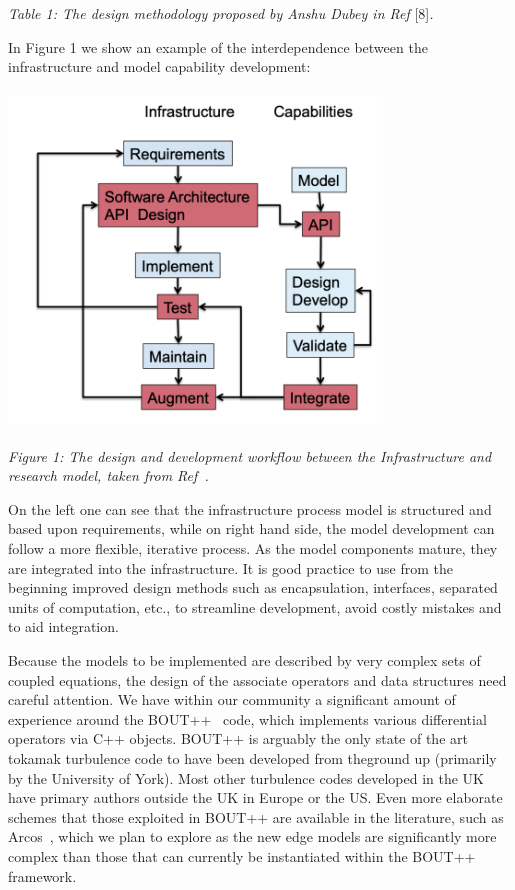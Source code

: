 \documentclass{article}
\begin{document}
\begin{center}
\textit{Table 1: The design methodology proposed by Anshu Dubey in Ref }[8]\textit{.}
\end{center}

\baselineskip=18pt
In Figure 1 we show an example of the interdependence between the infrastructure 
and model capability development:

\begin{center}
\includegraphics[width=281pt, height=253pt, keepaspectratio=true]{../png/wkflow.png}

\label{HRef34587331}
\end{center}

\baselineskip=18pt
{ \textit{Figure 1: The design and development workflow between 
the Infrastructure and research model, taken from Ref~\cite{ref [8]}.}}

On the left one can see that the infrastructure process model is structured and 
based upon requirements, while on right hand side, the model development can follow 
a more flexible, iterative process. As the model components mature, they are integrated 
into the infrastructure. It is good practice to use from the beginning improved 
design methods such as encapsulation, interfaces, separated units of computation, 
etc., to streamline development, avoid costly mistakes and to aid integration.

Because the models to be implemented are described by very complex sets of coupled 
equations, the design of the associate operators and data structures need careful 
attention. We have within our community a significant amount of experience around 
the BOUT++~\cite{ref [9]} code, which implements various differential operators via C++ objects. 
 BOUT++ is arguably the only state of the art tokamak turbulence code to have been 
developed from theground up (primarily by the University of York). Most other turbulence 
codes developed in the UK have primary authors outside the UK in Europe or the 
US. Even more elaborate schemes that those exploited in BOUT++ are available in 
the literature, such as Arcos~\cite{ref [10]}, which we plan to explore as the new edge models 
are significantly more complex than those that can currently be instantiated within 
the BOUT++ framework.
\end{document}
